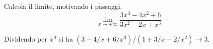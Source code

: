
\begin{esercizio}
Calcola il limite, motivando i passaggi.
\[
        \lim_{x\to +\infty}
        \frac{3x^3-4x^2+6}{3x^2-2x+x^3}
    \]
\end{esercizio}

\begin{soluzione}
Dividendo per $x^3$ si ha $(3-4/x+6/x^3)/(1+3/x-2/x^2)\to3$.
\end{soluzione}
